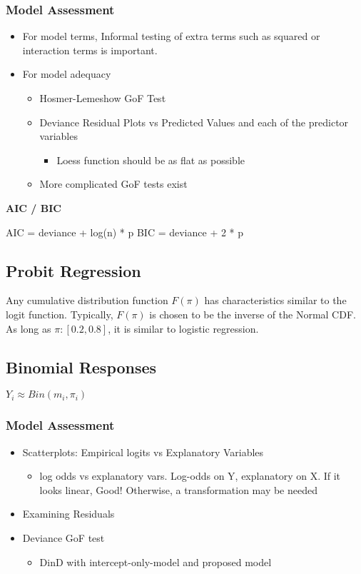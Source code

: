 \documentclass[11pt]{article}
\begin{document}
\subsubsection{Model Assessment}
\label{sec:org64821db}
\begin{itemize}
\item For model terms, Informal testing of extra terms such as squared or
interaction terms is important.
\item For model adequacy

\begin{itemize}
\item Hosmer-Lemeshow GoF Test
\item Deviance Residual Plots vs Predicted Values and each of the
predictor variables

\begin{itemize}
\item Loess function should be as flat as possible
\end{itemize}

\item More complicated GoF tests exist
\end{itemize}
\end{itemize}

\textbf{AIC / BIC}

AIC = deviance + log(n) * p BIC = deviance + 2 * p

\subsection{Probit Regression}
\label{sec:orga4d2bc7}
Any cumulative distribution function \(F(\pi)\) has characteristics
similar to the logit function. Typically, \(F(\pi)\) is chosen to be the
inverse of the Normal CDF. As long as \(\pi:[0.2,0.8]\), it is similar to
logistic regression.

\subsection{Binomial Responses}
\label{sec:org36f3282}
\(Y_i \approx Bin(m_i, \pi_i)\)

\subsubsection{Model Assessment}
\label{sec:org076bccd}
\begin{itemize}
\item Scatterplots: Empirical logits vs Explanatory Variables
\begin{itemize}
\item log odds vs explanatory vars. Log-odds on Y, explanatory on X. If
it looks linear, Good! Otherwise, a transformation may be needed
\end{itemize}
\item Examining Residuals
\item Deviance GoF test
\begin{itemize}
\item DinD with intercept-only-model and proposed model
\end{itemize}
\end{itemize}
\end{document}

